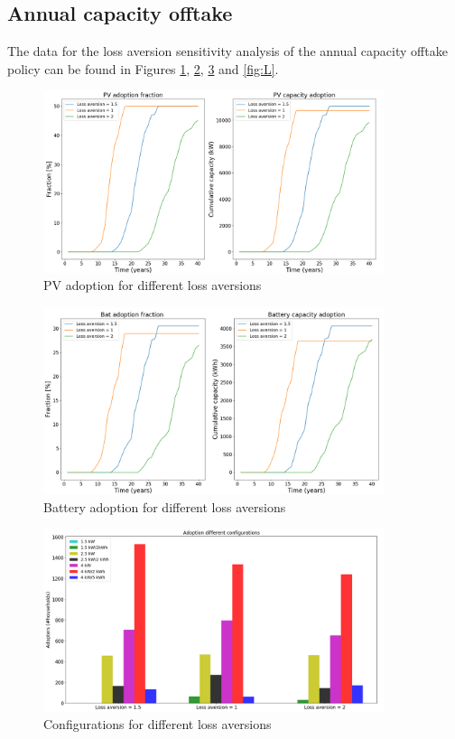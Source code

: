 \subsection{Annual capacity offtake}
The data for the loss aversion sensitivity analysis of the annual capacity offtake policy can be found in Figures \ref{fig:I}, \ref{fig:J}, \ref{fig:K} and \ref{fig:L}.
\newline 
\begin{figure}[h!]
    \centering
    \includegraphics[width=10cm]{AppendixA/PVCaploss.png}
    \caption{PV adoption for different loss aversions}
    \label{fig:I}
\end{figure}
\noindent
\newline 
\begin{figure}[h!]
    \centering
    \includegraphics[width=10cm]{AppendixA/BatCaploss.png}
    \caption{Battery adoption for different loss aversions}
    \label{fig:J}
\end{figure}
\noindent
\newline 
\begin{figure}[h!]
    \centering
    \includegraphics[width=10cm]{AppendixA/ConfigCaploss.png}
    \caption{Configurations for different loss aversions}
    \label{fig:K}
\end{figure}
